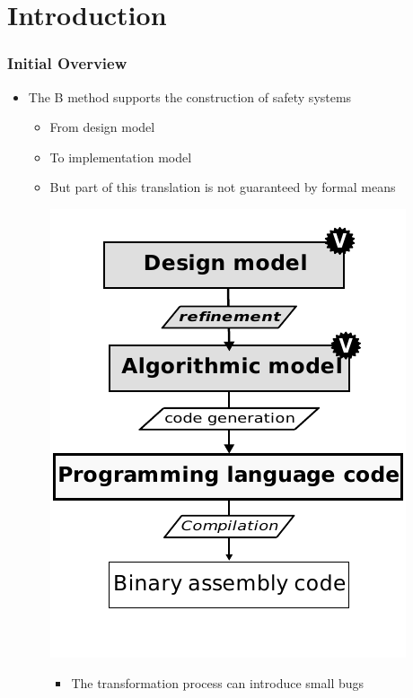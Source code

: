 
\section{Introduction}


\begin{frame}
\frametitle{Initial Overview}

\begin{itemize}[<+->]
  \item The B method supports the construction of safety systems
  \begin{itemize}
    \item From design model
    \item To implementation model
    \item But part of this translation is not guaranteed by formal means\\
    \begin{center}
       \includegraphics[height=.5\textheight]{figures/b-method-actual_new.pdf}
    \end{center}
       \begin{itemize} \item   \small{The transformation process can introduce small bugs}
       \end{itemize}
  \end{itemize}
\end{itemize}
   

	
\end{frame}



